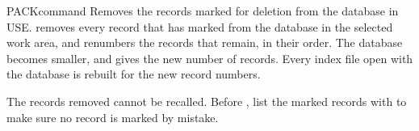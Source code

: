 \begin{XbaseEntry}{PACK}{command}
Removes the records marked for deletion from the database in USE.
\Syntax
{}
\Usage
{} removes every record that  has marked from the database
in the selected work area, and renumbers the records that remain, in their
order.  The database becomes smaller, and  gives the new
number of records.  Every index file open with the database is rebuilt for the
new record numbers.

The records removed cannot be recalled.
\Tips
Before , list the marked records with  to make
sure no record is marked by mistake.
\Examples
{}
\end{XbaseEntry}

